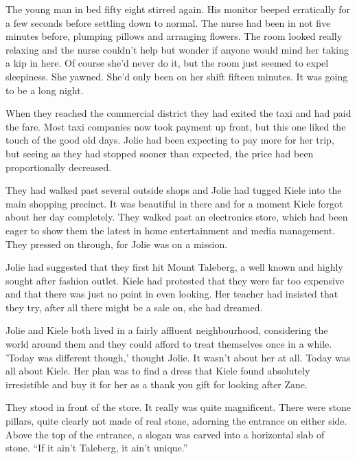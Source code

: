 \thoughtbreak



The young man in bed fifty eight stirred again.  His monitor beeped erratically for a few seconds before settling down to normal.  The nurse had been in not five minutes before, plumping pillows and arranging flowers.  The room looked really relaxing and the nurse couldn't help but wonder if anyone would mind her taking a kip in here.  Of course she'd never do it, but the room just seemed to expel sleepiness.  She yawned.  She'd only been on her shift fifteen minutes.  It was going to be a long night.  



\thoughtbreak



When they reached the commercial district they had exited the taxi and had paid the fare.  Most taxi companies now took payment up front, but this one liked the touch of the good old days.  Jolie had been expecting to pay more for her trip, but seeing as they had stopped sooner than expected, the price had been proportionally decreased.

They had walked past several outside shops and Jolie had tugged Kiele into the main shopping precinct.  It was beautiful in there and for a moment Kiele forgot about her day completely.  They walked past an electronics store, which had been eager to show them the latest in home entertainment and media management.  They pressed on through, for Jolie was on a mission.

Jolie had suggested that they first hit Mount Taleberg, a well known and highly sought after fashion outlet.  Kiele had protested that they were far too expensive and that there was just no point in even looking.  Her teacher had insisted that they try, after all there might be a sale on, she had dreamed.  

Jolie and Kiele both lived in a fairly affluent neighbourhood, considering the world around them and they could afford to treat themselves once in a while.   'Today was different though,' thought Jolie.  It wasn't about her at all.  Today was all about Kiele.  Her plan was to find a dress that Kiele found absolutely irresistible and buy it for her as a thank you gift for looking after Zane.

They stood in front of the store.  It really was quite magnificent.  There were stone pillars, quite clearly not made of real stone, adorning the entrance on either side.  Above the top of the entrance, a slogan was carved into a horizontal slab of stone.  ``If it ain't Taleberg, it ain't unique.''



